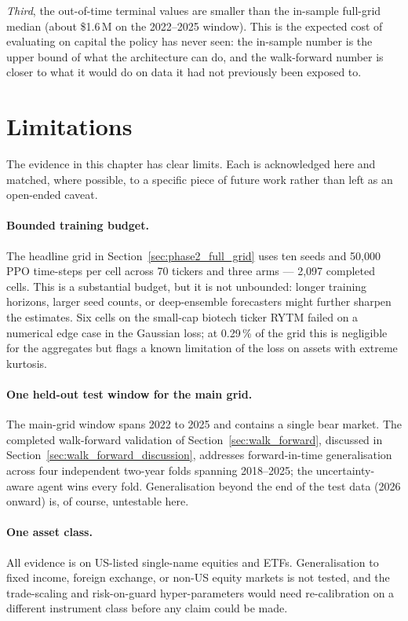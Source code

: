 \textit{Third}, the out-of-time terminal values are smaller than the in-sample full-grid median (about \$1.6\,M on the 2022--2025 window). This is the expected cost of evaluating on capital the policy has never seen: the in-sample number is the upper bound of what the architecture can do, and the walk-forward number is closer to what it would do on data it had not previously been exposed to.

\section{Limitations}
\label{sec:limitations}

The evidence in this chapter has clear limits. Each is acknowledged here and matched, where possible, to a specific piece of future work rather than left as an open-ended caveat.

\paragraph{Bounded training budget.} The headline grid in Section~\ref{sec:phase2_full_grid} uses ten seeds and 50,000 PPO time-steps per cell across 70 tickers and three arms --- 2,097 completed cells. This is a substantial budget, but it is not unbounded: longer training horizons, larger seed counts, or deep-ensemble forecasters might further sharpen the estimates. Six cells on the small-cap biotech ticker RYTM failed on a numerical edge case in the Gaussian loss; at 0.29\,\% of the grid this is negligible for the aggregates but flags a known limitation of the loss on assets with extreme kurtosis.

\paragraph{One held-out test window for the main grid.} The main-grid window spans 2022 to 2025 and contains a single bear market. The completed walk-forward validation of Section~\ref{sec:walk_forward}, discussed in Section~\ref{sec:walk_forward_discussion}, addresses forward-in-time generalisation across four independent two-year folds spanning 2018--2025; the uncertainty-aware agent wins every fold. Generalisation beyond the end of the test data (2026 onward) is, of course, untestable here.

\paragraph{One asset class.} All evidence is on US-listed single-name equities and ETFs. Generalisation to fixed income, foreign exchange, or non-US equity markets is not tested, and the trade-scaling and risk-on-guard hyper-parameters would need re-calibration on a different instrument class before any claim could be made.

